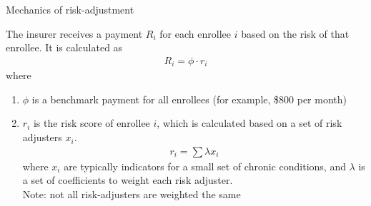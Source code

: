 \begin{frame}{Mechanics of risk-adjustment}

    The insurer receives a payment $R_i$ for each enrollee $i$ based on the risk of that enrollee.
    It is calculated as 
    \begin{align*}
        R_i = \phi \cdot r_i
    \end{align*}
    \vspace{-2mm}
    where
    \begin{enumerate}
        \item $\phi$ is a benchmark payment for all enrollees (for example, \$800 per month)
        \item $r_i$ is the risk score of enrollee $i$, which is calculated based on a set of risk adjusters $x_i$.
        \begin{align*}
            r_i = \sum \lambda x_i
        \end{align*}
        where $x_i$ are typically indicators for a small set of chronic conditions, and $\lambda$ is a set of coefficients to weight each risk adjuster.\\
        Note: not all risk-adjusters are weighted the same 
    \end{enumerate}

\end{frame}
